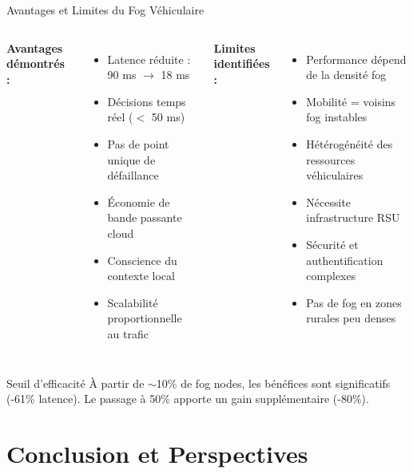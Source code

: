 \documentclass[10pt,aspectratio=169]{beamer}
\begin{document}
\begin{frame}{Avantages et Limites du Fog V\'ehiculaire}
\begin{columns}
\textbf{Avantages d\'emontr\'es :}
\begin{itemize}
    \item[$\checkmark$] Latence r\'eduite : 90 ms $\rightarrow$ 18 ms
    \item[$\checkmark$] D\'ecisions temps r\'eel ($<$ 50 ms)
    \item[$\checkmark$] Pas de point unique de d\'efaillance
    \item[$\checkmark$] \'Economie de bande passante cloud
    \item[$\checkmark$] Conscience du contexte local
    \item[$\checkmark$] Scalabilit\'e proportionnelle au trafic
\end{itemize}

\textbf{Limites identifi\'ees :}
\begin{itemize}
    \item[$\times$] Performance d\'epend de la densit\'e fog
    \item[$\times$] Mobilit\'e = voisins fog instables
    \item[$\times$] H\'et\'erog\'en\'eit\'e des ressources v\'ehiculaires
    \item[$\times$] N\'ecessite infrastructure RSU
    \item[$\times$] S\'ecurit\'e et authentification complexes
    \item[$\times$] Pas de fog en zones rurales peu denses
\end{itemize}
\end{columns}

\vspace{0.3cm}
\begin{alertblock}{Seuil d'efficacit\'e}
\`A partir de $\sim$10\% de fog nodes, les b\'en\'efices sont significatifs (-61\% latence). Le passage \`a 50\% apporte un gain suppl\'ementaire (-80\%).
\end{alertblock}
\end{frame}

\section{Conclusion et Perspectives}
\end{document}
